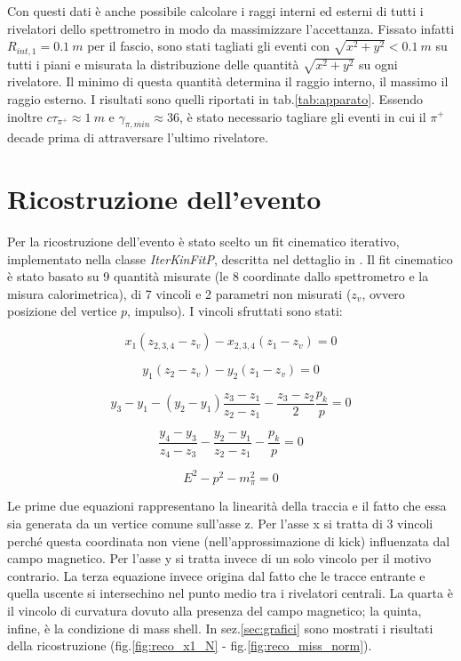 \documentclass[8pt]{extarticle}
\begin{document}
Con questi dati è anche possibile calcolare i raggi interni ed esterni di tutti i rivelatori dello spettrometro in modo da massimizzare l'accettanza. Fissato infatti $R_{int, 1} = 0.1\ m$ per il fascio, sono stati tagliati gli eventi con $\sqrt{x^2+y^2} < 0.1\ m$ su tutti i piani e misurata la distribuzione delle quantità $\sqrt{x^2 + y^2}$ su ogni rivelatore. Il minimo di questa quantità determina il raggio interno, il massimo il raggio esterno. I risultati sono quelli riportati in tab.\ref{tab:apparato}. Essendo inoltre $c\tau_{\pi^+} \approx 1\ m$ e $\gamma_{\pi, min} \approx 36$, è stato necessario tagliare gli eventi in cui il $\pi^+$ decade prima di attraversare l'ultimo rivelatore.

\section{Ricostruzione dell'evento} \label{sec:reconstruction}
Per la ricostruzione dell'evento è stato scelto un fit cinematico iterativo, implementato nella classe \textit{IterKinFitP}, descritta nel dettaglio in \cite{spettrometro}. Il fit cinematico è stato basato su 9 quantità misurate (le 8 coordinate dallo spettrometro e la misura calorimetrica), di 7 vincoli e 2 parametri non misurati ($z_v$, ovvero posizione del vertice $p$, impulso). I vincoli sfruttati sono stati: 

\begin{equation}
x_1 (z_{2,3,4} - z_v) - x_{2,3,4} (z_1 - z_v) = 0
\end{equation}

\begin{equation}
y_1 (z_{2} - z_v) - y_{2} (z_1 - z_v) = 0
\end{equation}

\begin{equation}
y_3 - y_1 - (y_2-y_1)\frac{z_3-z_1}{z_2-z_1} - \frac{z_3-z_2}{2} \frac{p_k}{p} = 0
\label{eq:curvaturay3}
\end{equation}

\begin{equation}
\frac{y_4-y_3}{z_4-z_3} - \frac{y_2-y_1}{z_2-z_1} - \frac{p_k}{p} = 0
\end{equation}

\begin{equation}
E^2 - p^2 - m_\pi^2 = 0
\end{equation}

Le prime due equazioni rappresentano la linearità della traccia e il fatto che essa sia generata da un vertice comune sull'asse z. Per l'asse x si tratta di 3 vincoli perché questa coordinata non viene (nell'approssimazione di kick) influenzata dal campo magnetico. Per l'asse y si tratta invece di un solo vincolo per il motivo contrario. La terza equazione invece origina dal fatto che le tracce entrante e quella uscente si intersechino nel punto medio tra i rivelatori centrali. La quarta è il vincolo di curvatura dovuto alla presenza del campo magnetico; la quinta, infine, è la condizione di mass shell. In sez.\ref{sec:grafici} sono mostrati i risultati della ricostruzione (fig.\ref{fig:reco_x1_N} - fig.\ref{fig:reco_miss_norm}).
\end{document}
